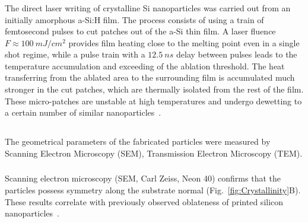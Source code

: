         \subsubsection{}
                The direct laser writing of crystalline Si nanoparticles was carried out from an initially amorphous a-Si:H film.
            The process consists of using a train of femtosecond pulses to cut patches out of the a-Si thin film\cite{makarov2016controllable,
            dmitriev2016direct}. A laser fluence $F\approx100~\si{mJ/cm^{2}}$ provides film heating close to the melting point even in a
            single shot regime, while a pulse train with a $12.5~\si{ns}$ delay between pulses leads to the temperature accumulation
            and exceeding of the ablation threshold. The heat transferring from the ablated area to the surrounding film is accumulated
            much stronger in the cut patches, which are thermally isolated from the rest of the film.
            These micro-patches are unstable at high temperatures and undergo dewetting to a certain number of similar
            nanoparticles~\cite{thompson2012solid}.


    \subsection{}
    \label{sec:SEM}
            The geometrical parameters of the fabricated particles were measured by Scanning Electron Microscopy (SEM),
        Transmission Electron Microscopy (TEM).

        \subsubsection{}
                Scanning electron microscopy (SEM, Carl Zeiss, Neon 40) confirms that the particles possess 
            symmetry along the substrate normal (Fig.~\ref{fig:Crystallinity}B). These results correlate with previously observed
            oblateness of printed silicon nanoparticles~\cite{zywietz2014laser}.

